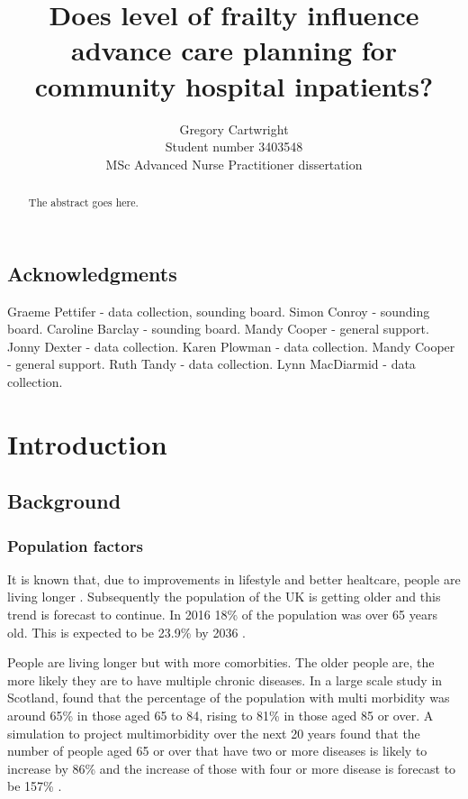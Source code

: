 \documentclass
[
	12pt,
	a4paper,
	oneside,
]{report}
\begin{document}
\author{Gregory Cartwright\\
	Student number 3403548\\
	MSc Advanced Nurse Practitioner dissertation
}
\title{Does level of frailty influence advance care planning 
	for community hospital inpatients?
}

\maketitle

\begin{abstract}
The abstract goes here.
\end{abstract}

\section*{Acknowledgments}
Graeme Pettifer - data collection, sounding board.
Simon Conroy - sounding board.
Caroline Barclay - sounding board.
Mandy Cooper - general support.
Jonny Dexter - data collection.
Karen Plowman - data collection.
Mandy Cooper - general support.
Ruth Tandy - data collection.
Lynn MacDiarmid - data collection.

\tableofcontents 

\chapter{Introduction}

\section{Background}

\subsection{Population factors}

It is known that, due to improvements in lifestyle and better healtcare, 
people are living longer \parencite{nao:08,ons:17}. Subsequently the population of 
the UK is getting older and this trend is forecast to continue.
In 2016 18\% of the population was over 65 years old. This is expected to be
23.9\% by 2036 \parencite{ons:17}.


People are living longer but with more comorbities. The older people are, the more
likely they are to have multiple chronic diseases. In a large scale study in
Scotland, \textcite{barnett:12} found that the percentage of the population with multi morbidity was around 
65\% in those aged 65 to 84, rising to 81\% in those aged 85 or over. A simulation 
to project multimorbidity over the next 20 years found that the number of people
aged 65 or over that have two or more diseases is likely to increase by 86\% and the
increase of those with four or more disease is forecast to be 157\%
\parencite{kingston:18}. 
\end{document}
